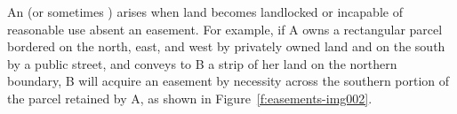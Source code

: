 An  (or sometimes )
arises when land becomes landlocked or incapable of reasonable use absent an
easement. For example, if A owns a rectangular parcel bordered on the north,
east, and west by privately owned land and on the south by a public street, and
conveys to B a strip of her land on the northern boundary, B will acquire an
easement by necessity across the southern portion of the parcel retained by A,
as shown in Figure~\ref{f:easements-img002}.



